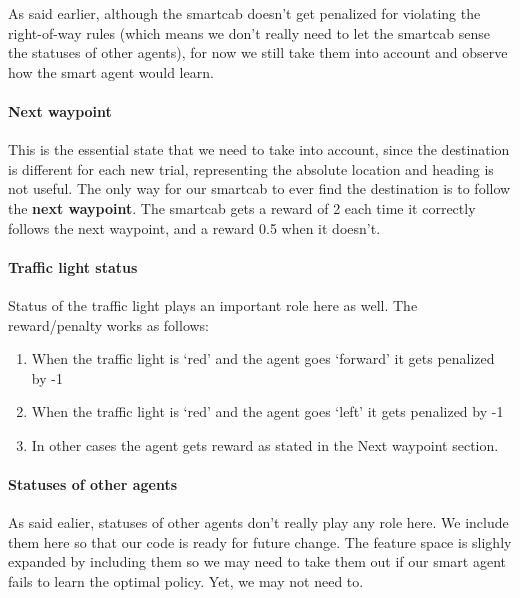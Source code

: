 \documentclass{article}
\providecommand{\tightlist}{%
      \setlength{\itemsep}{0pt}\setlength{\parskip}{0pt}}
\begin{document}
As said earlier, although the smartcab doesn't get penalized for
violating the right-of-way rules (which means we don't really need to
let the smartcab sense the statuses of other agents), for now we still
take them into account and observe how the smart agent would learn.

\paragraph{Next waypoint}\label{next-waypoint}

This is the essential state that we need to take into account, since the
destination is different for each new trial, representing the absolute
location and heading is not useful. The only way for our smartcab to
ever find the destination is to follow the \textbf{next waypoint}. The
smartcab gets a reward of 2 each time it correctly follows the next
waypoint, and a reward 0.5 when it doesn't.

\paragraph{Traffic light status}\label{traffic-light-status}

Status of the traffic light plays an important role here as well. The
reward/penalty works as follows:

\begin{enumerate}
\def\labelenumi{\arabic{enumi}.}
\tightlist
\item
  When the traffic light is `red' and the agent goes `forward' it gets
  penalized by -1
\item
  When the traffic light is `red' and the agent goes `left' it gets
  penalized by -1
\item
  In other cases the agent gets reward as stated in the Next waypoint
  section.
\end{enumerate}

\paragraph{Statuses of other agents}\label{statuses-of-other-agents}

As said ealier, statuses of other agents don't really play any role
here. We include them here so that our code is ready for future change.
The feature space is slighly expanded by including them so we may need
to take them out if our smart agent fails to learn the optimal policy.
Yet, we may not need to.
\end{document}
